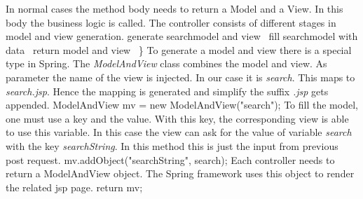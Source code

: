 \documentclass{llncs}%
\begin{document}
In normal cases the method body needs to return a Model and a View. In this body the business logic is called. The controller consists of different stages in model and view generation.
\nwenddocs{}\endmoddef\nwstartdeflinemarkup{}\nwenddeflinemarkup
\LA{}generate searchmodel and view~{\nwtagstyle{}}\RA{}
\LA{}fill searchmodel with data~{\nwtagstyle{}}\RA{}
\LA{}return model and view~{\nwtagstyle{}}\RA{}
\}
\nwendcode{}\nwdocspar
To generate a model and view there is a special type in Spring. The {\em ModelAndView} class combines the model and view. As parameter the name of the view is injected. In our case it is {\em search}. This maps to {\em search.jsp}. Hence the mapping is generated and simplify the suffix {\em .jsp} gets appended.
\nwenddocs{}\endmoddef\nwstartdeflinemarkup{}\nwenddeflinemarkup
ModelAndView mv = new ModelAndView("search");
\nwendcode{}\nwdocspar
To fill the model, one must use a key and the value. With this key, the corresponding view is able to use this variable. In this case the view can ask for the value of variable {\em search} with the key {\em searchString}. In this method this is just the input from previous post request.
\nwenddocs{}\endmoddef\nwstartdeflinemarkup{}\nwenddeflinemarkup
mv.addObject("searchString", search);
\nwendcode{}\nwdocspar
Each controller needs to return a ModelAndView object. The Spring framework uses this object to render the related jsp page.
\nwenddocs{}\endmoddef\nwstartdeflinemarkup{}\nwenddeflinemarkup
return mv;
\nwendcode{}\nwdocspar
\end{document}

